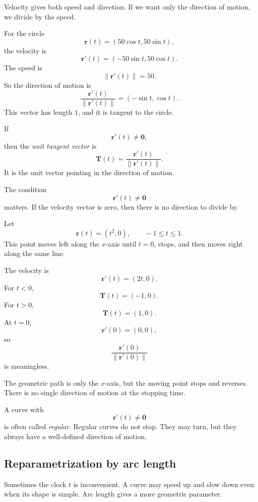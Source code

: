 Velocity gives both speed and direction.  If we want only the direction of motion, we
divide by the speed.

For the circle
\[
    \mathbf r(t)=(50\cos t,50\sin t),
\]
the velocity is
\[
    \mathbf r'(t)=(-50\sin t,50\cos t).
\]
The speed is
\[
    \|\mathbf r'(t)\|=50.
\]
So the direction of motion is
\[
    \frac{\mathbf r'(t)}{\|\mathbf r'(t)\|}
    =
    (-\sin t,\cos t).
\]
This vector has length \(1\), and it is tangent to the circle.

\begin{definition}
If
\[
    \mathbf r'(t)\ne\mathbf 0,
\]
then the \emph{unit tangent vector} is
\[
\boxed{
    \mathbf T(t)=\frac{\mathbf r'(t)}{\|\mathbf r'(t)\|}.
}
\]
It is the unit vector pointing in the direction of motion.
\end{definition}

The condition
\[
    \mathbf r'(t)\ne\mathbf 0
\]
matters.  If the velocity vector is zero, then there is no direction to divide by.

\begin{example}
Let
\[
    \mathbf r(t)=(t^2,0),
    \qquad -1\le t\le1.
\]
This point moves left along the \(x\)-axis until \(t=0\), stops, and then moves right
along the same line.

The velocity is
\[
    \mathbf r'(t)=(2t,0).
\]
For \(t<0\),
\[
    \mathbf T(t)=(-1,0).
\]
For \(t>0\),
\[
    \mathbf T(t)=(1,0).
\]
At \(t=0\),
\[
    \mathbf r'(0)=(0,0),
\]
so
\[
    \frac{\mathbf r'(0)}{\|\mathbf r'(0)\|}
\]
is meaningless.

The geometric path is only the \(x\)-axis, but the moving point stops and reverses.
There is no single direction of motion at the stopping time.
\end{example}

A curve with
\[
    \mathbf r'(t)\ne\mathbf 0
\]
is often called \emph{regular}.  Regular curves do not stop.  They may turn, but they
always have a well-defined direction of motion.

\subsection{Reparametrization by arc length}

Sometimes the clock \(t\) is inconvenient.  A curve may speed up and slow down even
when its shape is simple.  Arc length gives a more geometric parameter.

